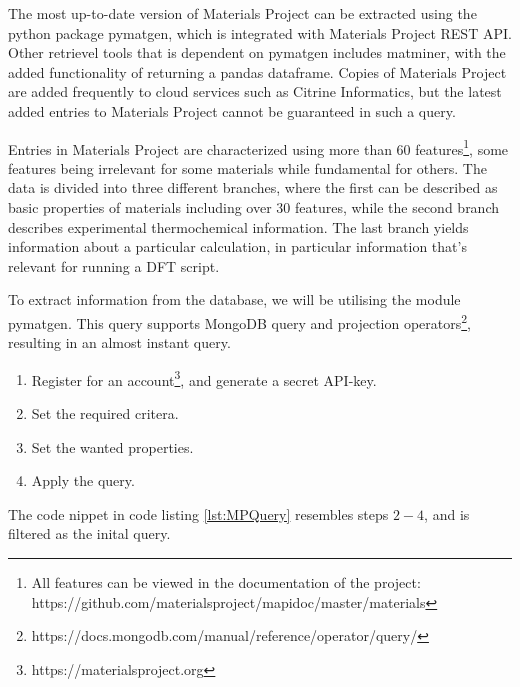 The most up-to-date version of Materials Project can be extracted using the python package pymatgen, which is integrated with Materials Project REST API. Other retrievel tools that is dependent on pymatgen includes matminer, with the added functionality of returning a pandas dataframe. Copies of Materials Project are added frequently to cloud services such as Citrine Informatics, but the latest added entries to Materials Project cannot be guaranteed in such a query.

Entries in Materials Project are characterized using more than 60 features\footnote{All features can be viewed in the documentation of the project: https://github.com/materialsproject/mapidoc/master/materials}, some features being irrelevant for some materials while fundamental for others. The data is divided into three different branches, where the first can be described as basic properties of materials including over $30$ features, while the second branch describes experimental thermochemical information. The last branch yields information about a particular calculation, in particular information that's relevant for running a DFT script.

To extract information from the database, we will be utilising the module pymatgen. This query supports MongoDB query and projection operators\footnote{https://docs.mongodb.com/manual/reference/operator/query/}, resulting in an almost instant query.

\begin{enumerate}
  \item Register for an account\footnote{https://materialsproject.org}, and generate a secret API-key.
  \item Set the required critera.
  \item Set the wanted properties.
  \item Apply the query.
\end{enumerate}

The code nippet in code listing \ref{lst:MPQuery} resembles steps $2-4$, and is filtered as the inital query. %



